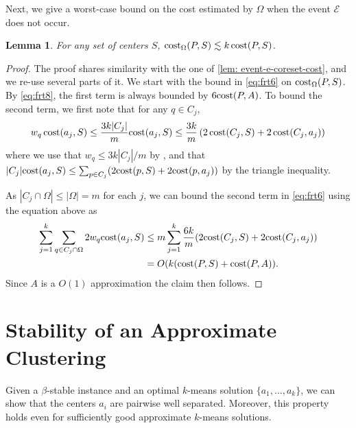 \documentclass[11pt]{article}
\newtheorem{lemma}{Lemma}[section]
\theoremstyle{restate}
\theoremstyle{definition}
\newcommand{\cost}{\textnormal{cost}}
\newcommand{\costom}{\cost_\Omega} %
\begin{document}
 Next, we give a worst-case bound on the cost estimated by $\Omega$ when the event $\mathcal{E}$ does not occur.
\begin{lemma}\label{lem: worst-case-coreset-cost}
    For any set of centers $S$, $\costom(P,S) \lesssim k \,\cost(P,S)$.
\end{lemma}
\begin{proof}
The proof shares similarity with the one of \cref{lem: event-e-coreset-cost}, and we re-use several parts of it.
We start with the bound in \eqref{eq:frt6} on $\costom(P,S)$. By \eqref{eq:frt8}, the first term is always bounded by $6 \cost(P,A)$. To bound the second term, we first note that 
for any $q\in C_j$, 
\begin{equation*}
    w_q\, \cost(a_j,S)  \leq \frac{3k|C_j|}{m} \cost(a_j,S)  \leq \frac{3k}{m}  \left(2\,\cost(C_j,S)+2\,\cost(C_j,a_j)\right)
\end{equation*}
where we use that $w_q\leq 3k|C_j|/m$ by , and that $|C_j|\cost(a_j,S) \leq  \sum_{p\in C_j} (2 \cost(p,S) + 2\cost(p,a_j))$ by the triangle inequality.

As $|C_j \cap \Omega| \leq |\Omega|=m$ for each $j$, 
we can bound the second term in \eqref{eq:frt6} using the equation above as
\begin{align*}\sum_{j=1}^k \sum_{q \in C_j \cap \Omega} 2w_q \cost(a_j,S) & \leq m \sum_{j=1}^k  \frac{6k}{m} (2\cost(C_j,S)+2\cost(C_j,a_j)) \\
& = O(k (\cost(P,S) + \cost (P,A)). 
\end{align*}
Since $A$ is a $O(1)$ approximation the claim then follows.
\end{proof}














\section{Stability of an Approximate Clustering}\label{ap:computeStable}
Given a $\beta$-stable instance and an optimal $k$-means  solution $\{a_1, \ldots, a_k\}$, we can show that the centers $a_i$ are pairwise well separated. Moreover, this property holds even for sufficiently good approximate $k$-means solutions. 
\end{document}
